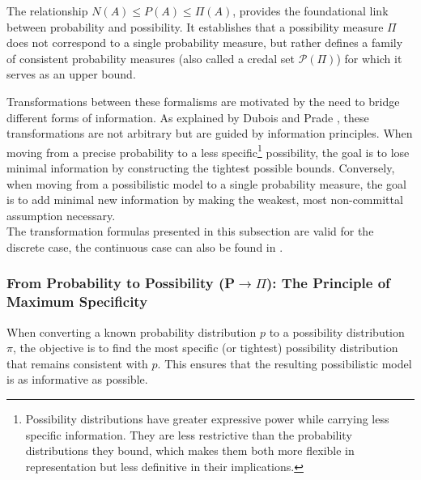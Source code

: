 


The relationship $N(A) \le P(A) \le \Pi(A)$, provides the foundational link between probability and possibility. It establishes that a possibility measure $\Pi$ does not correspond to a single probability measure, but rather defines a family of consistent probability measures (also called a credal set $\mathcal{P}(\Pi)$) for which it serves as an upper bound.

Transformations between these formalisms are motivated by the need to bridge different forms of information. As explained by Dubois and Prade \cite{Dubois1997}, these transformations are not arbitrary but are guided by information principles. When moving from a precise probability to a less specific\footnote{Possibility distributions have greater expressive power while carrying less specific information. They are less restrictive than the probability distributions they bound, which makes them both more flexible in representation but less definitive in their implications.} possibility, the goal is to lose minimal information by constructing the tightest possible bounds. Conversely, when moving from a possibilistic model to a single probability measure, the goal is to add minimal new information by making the weakest, most non-committal assumption necessary.\\
The transformation formulas presented in this subsection are valid for the discrete case, the continuous case can also be found in \cite{Dubois1997}.

\subsubsection{From Probability to Possibility (P$\to\Pi$): The Principle of Maximum Specificity}
When converting a known probability distribution $p$ to a possibility distribution $\pi$, the objective is to find the most specific (or tightest) possibility distribution that remains consistent with $p$. This ensures that the resulting possibilistic model is as informative as possible.

